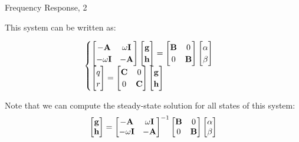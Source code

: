 \documentclass{beamer}
\begin{document}
\begin{frame}{Frequency Response, 2}
	\begin{flushleft}
		
		This system can be written as:
		
		\begin{align}
			\begin{cases}
				\begin{bmatrix}
					-\mathbf{A} & \omega \mathbf{I} \\
					-\omega \mathbf{I} & -\mathbf{A}
				\end{bmatrix}
				\begin{bmatrix}
					\mathbf{g} \\ \mathbf{h}
				\end{bmatrix}
				=
				\begin{bmatrix}
					\mathbf{B} & 0 \\  0 & \mathbf{B}
				\end{bmatrix}
				\begin{bmatrix}
				\alpha \\   \beta
				\end{bmatrix}
				\\
				\begin{bmatrix}
					q \\  r
				\end{bmatrix}
				= 
				\begin{bmatrix}
					\mathbf{C} & 0 \\  0 & \mathbf{C}
				\end{bmatrix}
				\begin{bmatrix}
				\mathbf{g} \\ \mathbf{h}
				\end{bmatrix}
			\end{cases}
		\end{align}		
		
		Note that we can compute the steady-state solution for all states of this system:
		\begin{align}
			\begin{bmatrix}
				\mathbf{g} \\ \mathbf{h}
			\end{bmatrix}
			= 
				\begin{bmatrix}
					-\mathbf{A} & \omega \mathbf{I} \\
					-\omega \mathbf{I} & -\mathbf{A}
				\end{bmatrix}^{-1}
				\begin{bmatrix}
					\mathbf{B} & 0 \\  0 & \mathbf{B}
				\end{bmatrix}
				\begin{bmatrix}
					\alpha \\   \beta
				\end{bmatrix}
		\end{align}		
		

\end{flushleft}
\end{frame}
\end{document}
